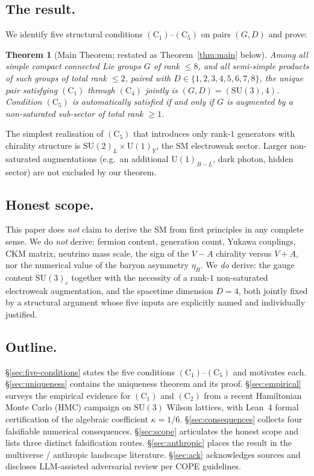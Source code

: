 \documentclass[11pt,reqno]{amsart}
\theoremstyle{plain}
\newtheorem{theorem}{Theorem}[section]
\theoremstyle{definition}
\theoremstyle{remark}
\newcommand{\SU}{\mathrm{SU}}
\newcommand{\Cone}{(\mathrm{C}_1)}
\newcommand{\Ctwo}{(\mathrm{C}_2)}
\newcommand{\Cfour}{(\mathrm{C}_4)}
\newcommand{\Cfive}{(\mathrm{C}_5)}
\begin{document}
\subsection{The result.}
We identify five structural conditions $\Cone$--$\Cfive$ on pairs $(G, D)$ and prove:

\begin{theorem}[Main Theorem; restated as Theorem~\ref{thm:main} below]
Among all simple compact connected Lie groups $G$ of rank $\le 8$, and all semi-simple products of such groups of total rank $\le 2$, paired with $D \in \{1, 2, 3, 4, 5, 6, 7, 8\}$, the unique pair satisfying $\Cone$ through $\Cfour$ jointly is $(G, D) = (\SU(3), 4)$. Condition $\Cfive$ is automatically satisfied if and only if $G$ is augmented by a non-saturated sub-sector of total rank $\ge 1$.
\end{theorem}

The simplest realisation of $\Cfive$ that introduces only rank-$1$ generators with chirality structure is $\SU(2)_L \times \mathrm{U}(1)_Y$, the SM electroweak sector. Larger non-saturated augmentations (e.g.\ an additional $\mathrm{U}(1)_{B-L}$, dark photon, hidden sector) are not excluded by our theorem.

\subsection{Honest scope.}
This paper does \emph{not} claim to derive the SM from first principles in any complete sense. We do \emph{not} derive: fermion content, generation count, Yukawa couplings, CKM matrix, neutrino mass scale, the sign of the $V{-}A$ chirality versus $V{+}A$, nor the numerical value of the baryon asymmetry $\eta_B$. We \emph{do} derive: the gauge content $\SU(3)_c$ together with the necessity of a rank-$1$ non-saturated electroweak augmentation, and the spacetime dimension $D = 4$, both jointly fixed by a structural argument whose five inputs are explicitly named and individually justified.

\subsection{Outline.}
\S\ref{sec:five-conditions} states the five conditions $\Cone$--$\Cfive$ and motivates each. \S\ref{sec:uniqueness} contains the uniqueness theorem and its proof. \S\ref{sec:empirical} surveys the empirical evidence for $\Cone$ and $\Ctwo$ from a recent Hamiltonian Monte Carlo (HMC) campaign on $\SU(3)$ Wilson lattices, with Lean~4 formal certification of the algebraic coefficient $\kappa = 1/6$. \S\ref{sec:consequences} collects four falsifiable numerical consequences. \S\ref{sec:scope} articulates the honest scope and lists three distinct falsification routes. \S\ref{sec:anthropic} places the result in the multiverse / anthropic landscape literature. \S\ref{sec:ack} acknowledges sources and discloses LLM-assisted adversarial review per COPE guidelines.
\end{document}

